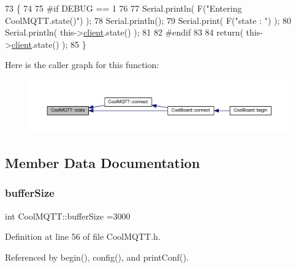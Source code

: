 \begin{DoxyCode}
73 \{
74 
75 \textcolor{preprocessor}{#if DEBUG == 1 }
76 
77     Serial.println( F(\textcolor{stringliteral}{"Entering CoolMQTT.state()"}) );
78     Serial.println();   
79     Serial.print( F(\textcolor{stringliteral}{"state : "}) );
80     Serial.println( this->\hyperlink{classCoolMQTT_a4ca71e4f76ef868692a297efd45b1415}{client}.state() );
81 
82 \textcolor{preprocessor}{#endif}
83     
84     \textcolor{keywordflow}{return}( this->\hyperlink{classCoolMQTT_a4ca71e4f76ef868692a297efd45b1415}{client}.state() );
85 \}
\end{DoxyCode}
Here is the caller graph for this function\+:
\nopagebreak
\begin{figure}[H]
\begin{center}
\leavevmode
\includegraphics[width=350pt]{classCoolMQTT_a5d003307eff78efbd585e42b43b72b6d_icgraph}
\end{center}
\end{figure}


\subsection{Member Data Documentation}
\mbox{\label{classCoolMQTT_a7f3cf26b51d6770f216e42c5ef13ca9f}} 
\subsubsection{\texorpdfstring{buffer\+Size}{bufferSize}}
{\footnotesize\ttfamily int Cool\+M\+Q\+T\+T\+::buffer\+Size =3000\hspace{0.3cm}{\ttfamily [private]}}



Definition at line 56 of file Cool\+M\+Q\+T\+T.\+h.



Referenced by begin(), config(), and print\+Conf().

\mbox{\label{classCoolMQTT_a4ca71e4f76ef868692a297efd45b1415}} 
